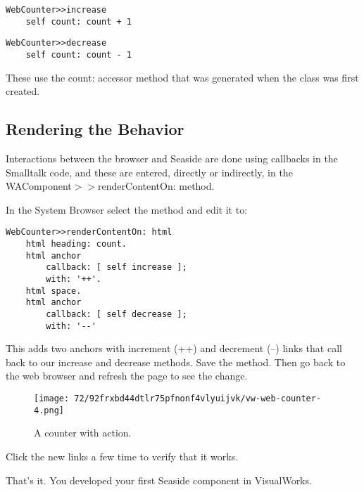 \documentclass[a4paper,10pt,twoside]{book}
\newcommand{\ct}[1]{{\small\ttfamily\textup{#1}}}
\begin{document}
\begin{lstlisting}
WebCounter>>increase 
    self count: count + 1 
\end{lstlisting}

\begin{lstlisting}
WebCounter>>decrease 
    self count: count - 1
\end{lstlisting}

These use the \ct{count:} accessor method that was generated when the class was first created.

\subsection{Rendering the Behavior}
\label{book:gettingstarted:cincomsmalltalk:component:renderingbehavior}

Interactions between the browser and Seaside are done using callbacks in the Smalltalk code, and these are entered, directly or indirectly, in the \ct{WAComponent$>$$>$renderContentOn:} method. 

In the System Browser select the method and edit it to:

\begin{lstlisting}
WebCounter>>renderContentOn: html 
    html heading: count. 
    html anchor 
        callback: [ self increase ]; 
        with: '++'. 
    html space. 
    html anchor 
        callback: [ self decrease ]; 
        with: '--' 
\end{lstlisting}

This adds two anchors with increment (++) and decrement (--) links that call back to our increase and decrease methods. Save the method. Then go back to the web browser and refresh the page to see the change.

\begin{figure}[h!tbp]
	\begin{center}
		\texttt{[image: 72/92frxbd44dtlr75pfnonf4vlyuijvk/vw-web-counter-4.png]}
		\caption{A counter with action.\label{book:gettingstarted:cincomsmalltalk:component:renderingbehavior:counter}}
	\end{center}
\end{figure}


Click the new links a few time to verify that it works. 

That's it. You developed your first Seaside component in VisualWorks.
\end{document}
